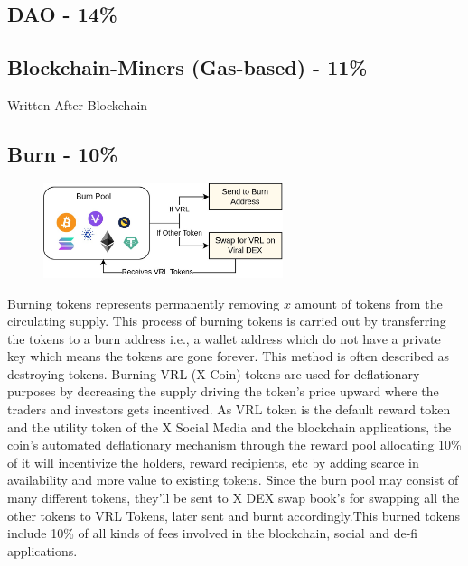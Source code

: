 \documentclass[letterpaper,11pt]{article}
\begin{document}
\subsection{\textbf{DAO - 14\%}}


\subsection{\textbf{Blockchain-Miners (Gas-based) - 11\%}}

Written After Blockchain\\

\subsection{\textbf{Burn - 10\%}}
\begin{figure}[H]
\begin{center}
\includegraphics[width=7cm]{burnpool}
\end{center}
\end{figure}

Burning tokens represents permanently removing $x$ amount of tokens from the circulating supply. This process of burning tokens is carried out by transferring the tokens to a burn address i.e., a wallet address which do not have a private key which means the tokens are gone forever. This method is often described as destroying tokens.  Burning VRL (X Coin) tokens are used for deflationary purposes by decreasing the supply driving the token's price upward where the traders and investors gets incentived. As VRL token is the default reward token and the utility token of the X Social Media and the blockchain applications, the coin's automated deflationary mechanism through the reward pool allocating 10\% of it will incentivize the holders, reward recipients, etc by adding scarce in availability and more value to existing tokens. Since the burn pool may consist of many different tokens, they'll be sent to X DEX swap book's for swapping all the other tokens to VRL Tokens, later sent and burnt accordingly.This burned tokens include 10\% of all kinds of fees involved in the blockchain, social and de-fi applications.\\
\end{document}
